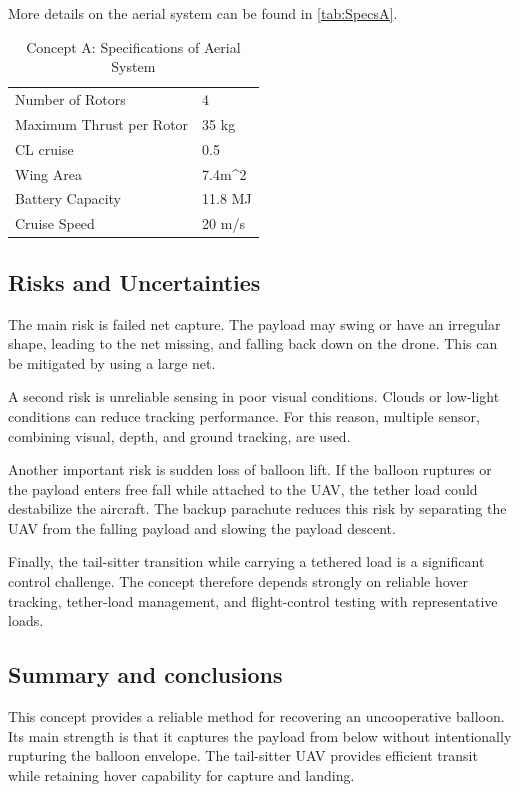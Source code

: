 More details on the aerial system can be found in \autoref{tab:SpecsA}.


\begin{table}[H]
\centering
\caption{Concept A: Specifications of Aerial System}
\label{tab:SpecsA}
\begin{tabular}{ll}
\hline
Number of Rotors         & 4                       \\
Maximum Thrust per Rotor & 35 kg                   \\
CL cruise                & 0.5                     \\
Wing Area                & 7.4m\textasciicircum{}2 \\
Battery Capacity         & 11.8 MJ                 \\ 
Cruise Speed             & 20 m/s\\
\hline
\end{tabular}
\end{table}

\subsection{Risks and Uncertainties}
The main risk is failed net capture. The payload may swing or have an irregular shape, leading to the net missing, and falling back down on the drone. This can be mitigated by using a large net. 

A second risk is unreliable sensing in poor visual conditions. Clouds or low-light conditions can reduce tracking performance. For this reason, multiple sensor, combining visual, depth, and ground tracking, are used.

Another important risk is sudden loss of balloon lift. If the balloon ruptures or the payload enters free fall while attached to the UAV, the tether load could destabilize the aircraft. The backup parachute reduces this risk by separating the UAV from the falling payload and slowing the payload descent.

Finally, the tail-sitter transition while carrying a tethered load is a significant control challenge. The concept therefore depends strongly on reliable hover tracking, tether-load management, and flight-control testing with representative loads.

\subsection{Summary and conclusions}
This concept provides a reliable method for recovering an uncooperative balloon. Its main strength is that it captures the payload from below without intentionally rupturing the balloon envelope. The tail-sitter UAV provides efficient transit while retaining hover capability for capture and landing.


